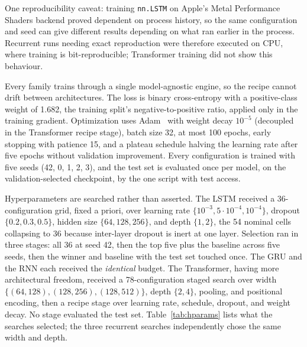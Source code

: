 \documentclass[mti,article,submit,moreauthors]{Definitions/mdpi}
\begin{document}
One reproducibility caveat: training \texttt{nn.LSTM} on Apple's Metal Performance Shaders backend proved dependent on process history, so the same configuration and seed can give different results depending on what ran earlier in the process. Recurrent runs needing exact reproduction were therefore executed on CPU, where training is bit-reproducible; Transformer training did not show this behaviour.

Every family trains through a single model-agnostic engine, so the recipe cannot drift between architectures. The loss is binary cross-entropy with a positive-class weight of 1.682, the training split's negative-to-positive ratio, applied only in the training gradient. Optimization uses Adam~\citep{kingma2015adam} with weight decay $10^{-5}$ (decoupled in the Transformer recipe stage), batch size 32, at most 100 epochs, early stopping with patience 15, and a plateau schedule halving the learning rate after five epochs without validation improvement. Every configuration is trained with five seeds (42, 0, 1, 2, 3), and the test set is evaluated once per model, on the validation-selected checkpoint, by the one script with test access.

Hyperparameters are searched rather than asserted. The LSTM received a 36-configuration grid, fixed a priori, over learning rate $\{10^{-3}, 5{\cdot}10^{-4}, 10^{-4}\}$, dropout $\{0.2, 0.3, 0.5\}$, hidden size $\{64, 128, 256\}$, and depth $\{1, 2\}$, the 54 nominal cells collapsing to 36 because inter-layer dropout is inert at one layer. Selection ran in three stages: all 36 at seed 42, then the top five plus the baseline across five seeds, then the winner and baseline with the test set touched once. The GRU and the RNN each received the \emph{identical} budget. The Transformer, having more architectural freedom, received a 78-configuration staged search over width $\{(64,128), (128,256), (128,512)\}$, depth $\{2, 4\}$, pooling, and positional encoding, then a recipe stage over learning rate, schedule, dropout, and weight decay. No stage evaluated the test set. Table~\ref{tab:hparams} lists what the searches selected; the three recurrent searches independently chose the same width and depth.
\end{document}

